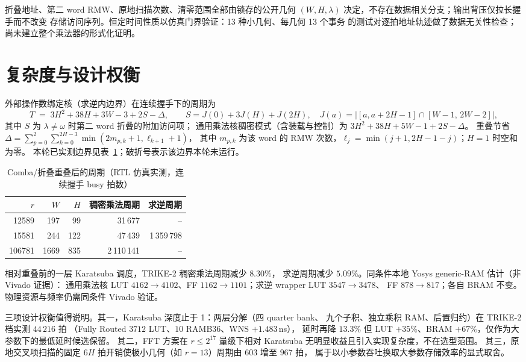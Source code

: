 \documentclass{article}
\newcommand{\wop}{\omega}
\begin{document}
折叠地址、第二 word RMW、原地扫描次数、清零范围全部由锁存的公开几何
$(W,H,\lambda)$ 决定，不存在数据相关分支；输出背压仅拉长握手而不改变
存储访问序列。恒定时间性质以仿真门界验证：13 种小几何、每几何 13 个事务
的测试对逐拍地址轨迹做了数据无关性检查；尚未建立整个乘法器的形式化证明。

\section{复杂度与设计权衡}

外部操作数绑定核（求逆内边界）在连续握手下的周期为
\begin{equation}
T \;=\; 3H^2 + 38H + 3W - 3 + 2S - \Delta, \qquad
S = J(0)+3J(H)+J(2H),\quad J(a)=\bigl|[a,a{+}2H{-}1]\cap[W{-}1,\,2W{-}2]\bigr|,
\end{equation}
其中 $S$ 为 $\lambda\ne\wop$ 时第二 word 折叠的附加访问项；
通用乘法核稠密模式（含装载与控制）为 $3H^2+38H+5W-1+2S-\Delta$。
重叠节省
$\Delta=\sum_{p=0}^{2}\sum_{k=0}^{2H-3}\min(2m_{p,k}+1,\ell_{k+1}+1)$，
其中 $m_{p,k}$ 为该 word 的 RMW 次数，$\ell_j=\min(j+1,2H-1-j)$；$H=1$ 时空和为零。
本轮已实测边界见表~\ref{tab:cycles}；破折号表示该边界本轮未运行。

\begin{table}[htbp]
\centering
\caption{Comba/折叠重叠后的周期（RTL 仿真实测，连续握手 busy 拍数）}
\label{tab:cycles}
\begin{tabular}{rrrrr}
\toprule
$r$ & $W$ & $H$ & 稠密乘法周期 & 求逆周期 \\
\midrule
12589 & 197 & 99 & 31\,677 & -- \\
15581 & 244 & 122 & 47\,439 & 1\,359\,798 \\
106781 & 1669 & 835 & 2\,110\,141 & -- \\
\bottomrule
\end{tabular}
\end{table}

相对重叠前的一层 Karatsuba 调度，TRIKE-2 稠密乘法周期减少 $8.30\%$，
求逆周期减少 $5.09\%$。同条件本地 Yosys generic-RAM 估计（非 Vivado 证据）：
通用乘法核 LUT $4162\to4102$、FF $1162\to1101$；求逆 wrapper LUT $3547\to3478$、
FF $878\to817$；各自 BRAM 不变。物理资源与频率仍需同条件 Vivado 验证。

三项设计权衡值得说明。其一，Karatsuba 深度止于 1：两层分解（四 quarter bank、
九个子积、独立乘积 RAM、后置归约）在 TRIKE-2 档实测 $44\,216$ 拍
（Fully Routed $3712$ LUT、$10$ RAMB36、WNS $+1.483$\,ns），
延时再降 $13.3\%$ 但 LUT $+35\%$、BRAM $+67\%$，仅作为大参数下的最低延时候选保留。
其二，FFT 方案在 $r\le 2^{17}$ 量级下相对 Karatsuba 无明显收益且引入实现复杂度，不在选型范围。
其三，原地交叉项扫描的固定 $6H$ 拍开销使极小几何（如 $r{=}13$）周期由 $603$ 增至 $967$ 拍，
属于以小参数吞吐换取大参数存储效率的显式取舍。
\end{document}
